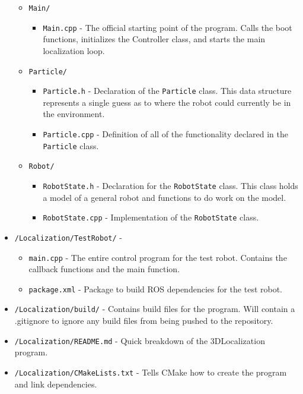 \documentclass[a4paper,11pt]{article}
\begin{document}
\begin{itemize}
\begin{itemize}
\begin{itemize}
\begin{itemize}
            \end{itemize}
        \end{itemize}
      \item \texttt{Main/}
        \begin{itemize}
          \item \texttt{Main.cpp} - The official starting point of the program. Calls the boot functions, initializes the Controller class, and starts the main localization loop.
        \end{itemize}
      \item \texttt{Particle/}
        \begin{itemize}
          \item \texttt{Particle.h} - Declaration of the \texttt{Particle} class. This data structure represents a single guess as to where the robot could currently be in the environment. 
          \item \texttt{Particle.cpp} - Definition of all of the functionality declared in the \texttt{Particle} class.
        \end{itemize}
      \item \texttt{Robot/}
        \begin{itemize}
          \item \texttt{RobotState.h} - Declaration for the \texttt{RobotState} class. This class holds a model of a general robot and functions to do work on the model. 
          \item \texttt{RobotState.cpp} - Implementation of the \texttt{RobotState} class.
        \end{itemize}
    \end{itemize}

    \item \texttt{/Localization/TestRobot/} - 
      \begin{itemize}
        \item \texttt{main.cpp} - The entire control program for the test robot. Contains the callback functions and the main function.
        \item \texttt{package.xml} - Package to build ROS dependencies for the test robot.
      \end{itemize}

    \item \texttt{/Localization/build/} - Contains build files for the program. Will contain a .gitignore to ignore any build files from being pushed to the repository. 

    \item \texttt{/Localization/README.md} - Quick breakdown of the 3DLocalization program.

    \item \texttt{/Localization/CMakeLists.txt} - Tells CMake how to create the program and link dependencies.
  \end{itemize}


  
  
  


  

  
\end{document}

